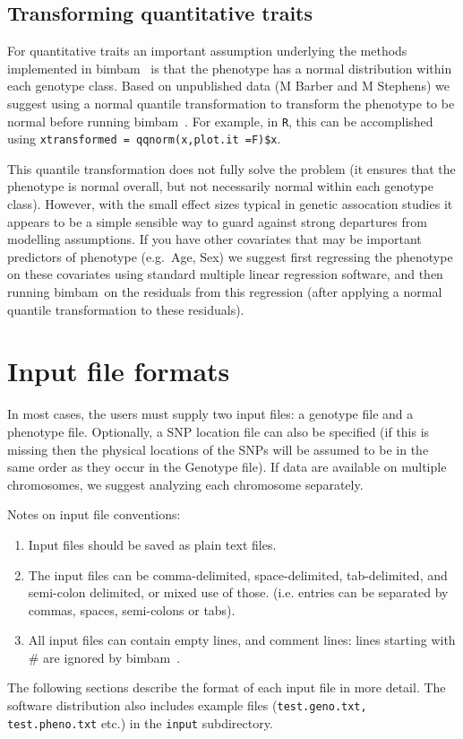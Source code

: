 \documentclass[11pt,Palatino]{article}
\def\bimbam{{\sc bimbam}~}
\begin{document}

\subsection{Transforming quantitative traits}

For quantitative traits
an important assumption underlying the methods implemented in \bimbam
is that the phenotype has a normal distribution within each genotype class.
Based on unpublished data (M Barber and M Stephens) we suggest using a normal quantile transformation
to transform the phenotype to be normal before running \bimbam. For example, in {\tt R}, this can
be accomplished using {\tt xtransformed = qqnorm(x,plot.it =F)\$x}.

This quantile transformation does not
fully solve the problem (it ensures that the phenotype is normal overall, but not necessarily
normal within each genotype class). However, with the small effect sizes typical
in genetic assocation studies it appears to be a simple sensible way to guard against
strong departures from modelling assumptions. If you have other covariates
that may be important predictors of phenotype (e.g.~Age, Sex) we suggest first regressing
the phenotype on these covariates using standard multiple linear regression software, and then
running \bimbam on the residuals from this regression (after applying a normal quantile transformation
to these residuals).

\section{Input file formats}

In most cases, the users must supply two input files: a genotype file and a phenotype file. Optionally, a SNP location file can also be specified (if this is missing then the physical locations of the SNPs will be assumed to be in the same order as they occur in the Genotype file). If data are available on multiple chromosomes, we suggest analyzing each chromosome separately.

Notes on input file conventions:
\begin{enumerate}
\item Input files should be saved as plain text files.
\item The input files can be comma-delimited, space-delimited, tab-delimited, and semi-colon delimited, or mixed use of those. (i.e. entries can be separated by commas, spaces, semi-colons or tabs).
\item All input files can contain empty lines, and comment lines: lines starting with \# are ignored by \bimbam.
\end{enumerate}
The following sections describe the format of each input file in more detail. The software distribution also includes example
files ({\tt test.geno.txt, test.pheno.txt} etc.) in the {\tt input} subdirectory.
\end{document}
